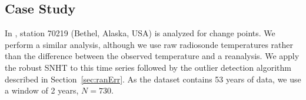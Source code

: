 \documentclass[12pt]{article}
\begin{document}
\begin{doublespacing}

\section{Case Study}

In \cite{haimberger07}, station 70219 (Bethel, Alaska, USA) is analyzed for change points.  We perform a similar analysis, although we use raw radiosonde temperatures rather than the difference between the observed temperature  and a reanalysis.  We apply the robust SNHT to this time series followed by the outlier detection algorithm described in Section~\ref{sec:ranErr}.  As the dataset contains 53 years of data, we use a window of 2 years, $N=730$.


\end{doublespacing}
\end{document}
